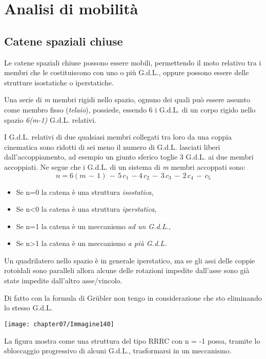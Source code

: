 \section{Analisi di mobilità}
\subsection{Catene spaziali chiuse}

Le catene spaziali chiuse possono essere mobili, permettendo il moto relativo tra i membri che le costituiscono con uno o più G.d.L., oppure possono essere delle strutture isostatiche o iperstatiche.

Una serie di \emph{m} membri rigidi nello spazio, ognuno dei quali può essere assunto come membro fisso (\emph{telaio}), possiede, essendo 6 i G.d.L. di un corpo rigido nello spazio \emph{6(m-1)} G.d.L. relativi.

I G.d.L. relativi di due qualsiasi membri collegati tra loro da una coppia cinematica sono ridotti di sei meno il numero di G.d.L. lasciati liberi dall'accoppiamento, ad esempio un giunto sferico toglie 3 G.d.L. ai due membri accoppiati. Ne segue che i G.d.L. di un sistema di \emph{m} membri accoppati sono:
\[n= 6(m\,-\,1)\,-\,5\,c_1\,-4\,c_2\,-\,3\,c_3\,-\,2\,c_4\,-\,c_5\]
\begin{itemize}
\item Se n=0 la catena è una struttura \emph{isostatica},
\item Se n<0 la catena è una struttura \emph{iperstatica},
\item Se n=1 la catena è un meccanismo \emph{ad un G.d.L.},
\item Se n>1 la catena è un meccanismo \emph{a più G.d.L.}
\end{itemize}

Un quadrilatero nello spazio è in generale iperstatico, ma se gli assi delle coppie rotoidali sono paralleli allora alcune delle rotazioni impedite dall'asse sono già state impedite dall'altro asse/vincolo.

Di fatto con la formula di Gr\"ubler non tengo in considerazione che sto eliminando lo stesso G.d.L.

\begin{center}
\texttt{[image: chapter07/Immagine140]}
\end{center}

La figura mostra come una struttura del tipo RRRC con n = -1 possa, tramite lo sbloccaggio progressivo di alcuni G.d.L., trasformarsi in un meccanismo.


